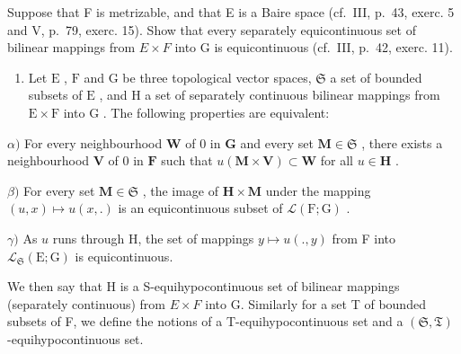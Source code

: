 Suppose that F is metrizable, and that E is a Baire space (cf.~III, p.~43, exerc. 5 and V, p.~79, exerc. 15). Show that every separately equicontinuous set of bilinear mappings from \(E \times F\) into G is equicontinuous (cf.~III, p.~42, exerc. 11).

\begin{enumerate}
\def\labelenumi{\arabic{enumi})}
\setcounter{enumi}{6}
\tightlist
\item
  Let \(\mathrm{E}\) , \(\mathrm{F}\) and \(\mathrm{G}\) be three topological vector spaces, \(\mathfrak{S}\) a set of bounded subsets of \(\mathrm{E}\) , and \(\mathrm{H}\) a set of separately continuous bilinear mappings from \(\mathrm{E} \times \mathrm{F}\) into \(\mathrm{G}\) . The following properties are equivalent:
\end{enumerate}

\(\alpha)\) For every neighbourhood \(\mathbf{W}\) of 0 in \(\mathbf{G}\) and every set \(\mathbf{M} \in \mathfrak{S}\) , there exists a neighbourhood \(\mathbf{V}\) of 0 in \(\mathbf{F}\) such that \(u(\mathbf{M} \times \mathbf{V}) \subset \mathbf{W}\) for all \(u \in \mathbf{H}\) .

\(\beta)\) For every set \(\mathbf{M} \in \mathfrak{S}\) , the image of \(\mathbf{H} \times \mathbf{M}\) under the mapping \((u, x) \mapsto u(x, .)\) is an equicontinuous subset of \(\mathcal{L}(\mathrm{F}; \mathrm{G})\) .

\(\gamma)\) As \(u\) runs through H, the set of mappings \(y \mapsto u(., y)\) from F into \(\mathcal{L}_{\mathfrak{S}}(\mathrm{E}; \mathrm{G})\) is equicontinuous.

We then say that H is a S-equihypocontinuous set of bilinear mappings (separately continuous) from \(E \times F\) into G. Similarly for a set T of bounded subsets of F, we define the notions of a T-equihypocontinuous set and a \((\mathfrak{S}, \mathfrak{T})\) -equihypocontinuous set.

